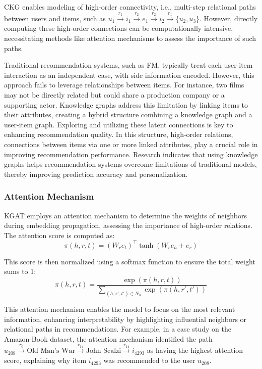 \documentclass{ieeeaccess}
\begin{document}
CKG enables modeling of high-order connectivity, i.e., multi-step relational paths between users and items, such as \(
u_1 \xrightarrow{r_1} i_1 \xrightarrow{r_2} e_1 \xrightarrow{r_2} i_2 \xrightarrow{r_1} \{u_2, u_3\}
\). However, directly computing these high-order connections can be computationally intensive, necessitating methods like attention mechanisms to assess the importance of such paths.

Traditional recommendation systems, such as FM, typically treat each user-item interaction as an independent case, with side information encoded. However, this approach fails to leverage relationships between items. For instance, two films may not be directly related but could share a production company or a supporting actor. Knowledge graphs address this limitation by linking items to their attributes, creating a hybrid structure combining a knowledge graph and a user-item graph. Exploring and utilizing these latent connections is key to enhancing recommendation quality. In this structure, high-order relations, connections between items via one or more linked attributes, play a crucial role in improving recommendation performance. Research \cite{wang2019kgat} indicates that using knowledge graphs helps recommendation systems overcome limitations of traditional models, thereby improving prediction accuracy and personalization.

\subsubsection{Attention Mechanism}

KGAT employs an attention mechanism to determine the weights of neighbors during embedding propagation, assessing the importance of high-order relations. The attention score is computed as:
\begin{equation}
\pi(h, r, t) = \left( W_r e_t \right)^\top \tanh \left( W_r e_h + e_r \right)
\end{equation}

This score is then normalized using a softmax function to ensure the total weight sums to 1:
\begin{equation}
\pi(h, r, t) = \frac{\exp(\pi(h, r, t))}{\sum_{(h, r', t') \in N_h} \exp(\pi(h, r', t'))}
\end{equation}

This attention mechanism enables the model to focus on the most relevant information, enhancing interpretability by highlighting influential neighbors or relational paths in recommendations. For example, in a case study on the Amazon-Book dataset, the attention mechanism identified the path \(
u_{208} \xrightarrow{r_0} \text{Old Man's War} \xrightarrow{r_{14}} \text{John Scalzi} \xrightarrow{r_{14}} i_{4293}
\) as having the highest attention score, explaining why item \( i_{4293} \) was recommended to the user \( u_{208} \).
\end{document}
